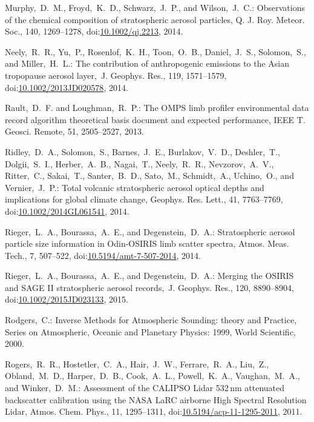 \documentclass[amtd, online, hvmath]{copernicus}
\begin{document}
\begin{thebibliography}{99}
Murphy,~D.~M., Froyd,~K.~D., Schwarz,~J.~P., and Wilson,~J.~C.: Observations
of the chemical composition of stratospheric aerosol particles, Q. J. Roy.
Meteor. Soc., 140, 1269--1278,
doi:\href{http://dx.doi.org/10.1002/qj.2213}{10.1002/qj.2213}, 2014.


Neely,~R.~R., Yu,~P., Rosenlof,~K.~H., Toon,~O.~B., Daniel,~J.~S.,
Solomon,~S., and Miller,~H.~L.: The contribution of anthropogenic 
emissions to the Asian tropopause aerosol layer,~J. Geophys. Res., 119,
1571--1579,
doi:\href{http://dx.doi.org/10.1002/2013JD020578}{10.1002/2013JD020578},
2014.


Rault,~D.~F. and Loughman,~R.~P.: The OMPS limb profiler environmental data
record algorithm theoretical basis document and expected performance, IEEE T.
Geosci. Remote, 51, 2505--2527, 2013.


Ridley,~D.~A., Solomon,~S., Barnes,~J.~E., Burlakov,~V.~D., Deshler,~T.,
Dolgii,~S.~I., Herber,~A.~B., Nagai,~T., Neely,~R.~R., Nevzorov,~A.~V.,
Ritter,~C., Sakai,~T., Santer,~B.~D., Sato,~M., Schmidt,~A., Uchino,~O., and
Vernier,~J.~P.: Total volcanic stratospheric aerosol optical depths and
implications for global climate change, Geophys. Res. Lett., 41, 7763--7769,
doi:\href{http://dx.doi.org/10.1002/2014GL061541}{10.1002/2014GL061541},
2014.


Rieger,~L.~A., Bourassa,~A.~E., and Degenstein,~D.~A.: Stratospheric aerosol
particle size information in Odin-OSIRIS limb scatter spectra, Atmos. Meas.
Tech., 7, 507--522,
doi:\href{http://dx.doi.org/10.5194/amt-7-507-2014}{10.5194/amt-7-507-2014},
2014.



Rieger,~L.~A., Bourassa,~A.~E., and Degenstein,~D.~A.: Merging the OSIRIS and
SAGE II stratospheric aerosol records,~J. Geophys. Res., 120, 8890--8904,
doi:\href{http://dx.doi.org/10.1002/2015JD023133}{10.1002/2015JD023133},
2015.


Rodgers,~C.: Inverse Methods for Atmospheric Sounding: theory and Practice,
Series on Atmospheric, Oceanic and Planetary Physics: 1999, World Scientific,
2000.


Rogers,~R.~R., Hostetler,~C.~A., Hair,~J.~W., Ferrare,~R.~A., Liu,~Z.,
Obland,~M.~D., Harper,~D.~B., Cook,~A.~L., Powell,~K.~A., Vaughan,~M.~A., and
Winker,~D.~M.: Assessment of the CALIPSO Lidar 532\,nm attenuated backscatter
calibration using the NASA LaRC airborne High Spectral Resolution Lidar,
Atmos. Chem. Phys., 11, 1295--1311,
doi:\href{http://dx.doi.org/10.5194/acp-11-1295-2011}{10.5194/acp-11-1295-2011},
2011.




\end{thebibliography}
\end{document}
